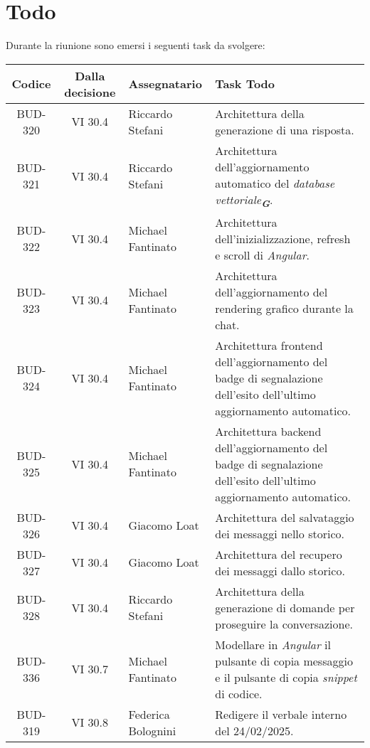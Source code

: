 
\section{Todo}

Durante la riunione sono emersi i seguenti task da svolgere:

\vspace{0.5cm}

\begin{table}[htbp]
\centering
{}
\begin{tabular}{|c|c|p{}|p{}|}
    \hline
    \rowcolor[gray]{0.75}
    \textbf{Codice} & \textbf{Dalla decisione} & \textbf{Assegnatario} & \textbf{Task Todo} \\
    \hline
    BUD-320 & VI 30.4 & Riccardo Stefani & Architettura della generazione di una risposta.\\
    \hline
    BUD-321 & VI 30.4 & Riccardo Stefani & Architettura dell’aggiornamento automatico del \emph{database vettoriale}\textsubscript{\textit{\textbf{G}}}.\\
    \hline
    BUD-322 & VI 30.4 & Michael Fantinato & Architettura dell’inizializzazione, refresh e scroll di \emph{Angular}.\\
    \hline 
    BUD-323 & VI 30.4 & Michael Fantinato & Architettura dell’aggiornamento del rendering grafico durante la chat.\\
    \hline 
    BUD-324 & VI 30.4 & Michael Fantinato & Architettura frontend dell’aggiornamento del badge di segnalazione dell’esito dell’ultimo aggiornamento automatico.\\
    \hline 
    BUD-325 & VI 30.4 & Michael Fantinato & Architettura backend dell’aggiornamento del badge di segnalazione dell’esito dell’ultimo aggiornamento automatico.\\
    \hline 
    BUD-326 & VI 30.4 & Giacomo Loat & Architettura del salvataggio dei messaggi nello storico.\\
    \hline 
    BUD-327 & VI 30.4 & Giacomo Loat & Architettura del recupero dei messaggi dallo storico.\\
    \hline 
    BUD-328 & VI 30.4 & Riccardo Stefani & Architettura della generazione di domande per proseguire la conversazione.\\
    \hline 
    BUD-336 & VI 30.7 & Michael Fantinato & Modellare in \emph{Angular} il pulsante di copia messaggio e il pulsante di copia \emph{snippet} di codice. \\
    \hline
    BUD-319 & VI 30.8 & Federica Bolognini & Redigere il verbale interno del 24/02/2025. \\
    \hline

\end{tabular}
\end{table}